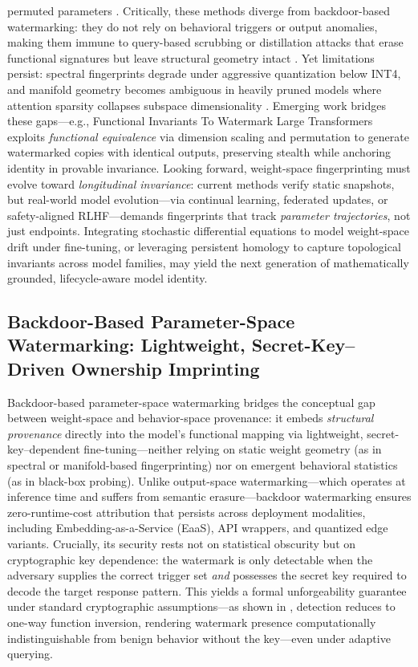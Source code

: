 \documentclass[11pt,a4paper]{article}
\begin{document}
permuted parameters \cite{doi:10.1145/3321705.3329808,arxiv:1701.04082}. Critically, these methods diverge from backdoor-based watermarking: they do not rely on behavioral triggers or output anomalies, making them immune to query-based scrubbing or distillation attacks that erase functional signatures but leave structural geometry intact \cite{arxiv:2402.19361,arxiv:2601.21252}. Yet limitations persist: spectral fingerprints degrade under aggressive quantization below INT4, and manifold geometry becomes ambiguous in heavily pruned models where attention sparsity collapses subspace dimensionality \cite{doi:10.1109/sds66131.2025.00024,doi:10.1145/3321705.3329808}. Emerging work bridges these gaps---e.g., Functional Invariants To Watermark Large Transformers exploits \emph{functional equivalence} via dimension scaling and permutation to generate watermarked copies with identical outputs, preserving stealth while anchoring identity in provable invariance. Looking forward, weight-space fingerprinting must evolve toward \emph{longitudinal invariance}: current methods verify static snapshots, but real-world model evolution---via continual learning, federated updates, or safety-aligned RLHF---demands fingerprints that track \emph{parameter trajectories}, not just endpoints. Integrating stochastic differential equations to model weight-space drift under fine-tuning, or leveraging persistent homology to capture topological invariants across model families, may yield the next generation of mathematically grounded, lifecycle-aware model identity.


\subsection{Backdoor-Based Parameter-Space Watermarking: Lightweight, Secret-Key--Driven Ownership Imprinting}


Backdoor-based parameter-space watermarking bridges the conceptual gap between weight-space and behavior-space provenance: it embeds \emph{structural provenance} directly into the model's functional mapping via lightweight, secret-key--dependent fine-tuning---neither relying on static weight geometry (as in spectral or manifold-based fingerprinting) nor on emergent behavioral statistics (as in black-box probing). Unlike output-space watermarking---which operates at inference time and suffers from semantic erasure---backdoor watermarking ensures zero-runtime-cost attribution that persists across deployment modalities, including Embedding-as-a-Service (EaaS), API wrappers, and quantized edge variants. Crucially, its security rests not on statistical obscurity but on cryptographic key dependence: the watermark is only detectable when the adversary supplies the correct trigger set \emph{and} possesses the secret key required to decode the target response pattern. This yields a formal unforgeability guarantee under standard cryptographic assumptions---as shown in \cite{arxiv:2405.13517}, detection reduces to one-way function inversion, rendering watermark presence computationally indistinguishable from benign behavior without the key---even under adaptive querying.
\end{document}
